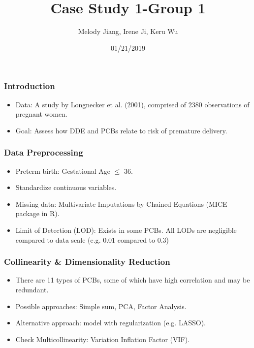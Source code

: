 \documentclass{beamer}
\title{Case Study 1-Group 1}
\author{Melody Jiang, Irene Ji, Keru Wu}
\institute{Department of Statistical Science, Duke University}
\date{01/21/2019}
\begin{document}
\frame{\titlepage}





\begin{frame}
\frametitle{Introduction}

\begin{itemize}
\item Data: A study by Longnecker et al. (2001), comprised of 2380 observations of pregnant women.
  
\item Goal: Assess how DDE and PCBs relate to risk of premature delivery.

\end{itemize}

\end{frame}







\begin{frame}
\frametitle{Data Preprocessing}
\begin{itemize}

\item Preterm birth: Gestational Age $\leq$ 36.
\pause
\item Standardize continuous variables.
\pause
\item Missing data: Multivariate Imputations by Chained Equations (MICE package in R). 
\pause
\item Limit of Detection (LOD): Exists in some PCBs. All LODs are negligible compared to data scale (e.g. 0.01 compared to 0.3)

\end{itemize}
\end{frame}




\begin{frame}
\frametitle{Collinearity \& Dimensionality Reduction}

\begin{itemize}

\item There are 11 types of PCBs, some of which have high correlation and may be redundant.
\pause
\item Possible approaches: Simple sum, PCA, Factor Analysis.
\pause
\item Alternative approach: model with regularization (e.g. LASSO).
\pause
\item Check Multicollinearity: Variation Inflation Factor (VIF).

\end{itemize}
\end{frame}
\end{document}
